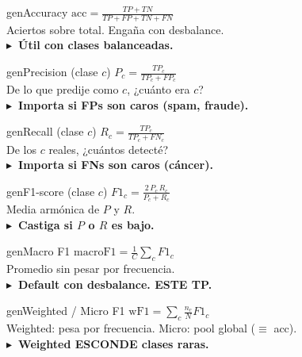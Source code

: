 \documentclass[10pt]{article}
\newcommand{\fb}[1]{{\color{label}\small #1}}
\newcommand{\tip}[2]{{\color{#1}\textbf{$\blacktriangleright$\ #2}}}
\newcommand{\formulabox}[1]{{\color{formula}\large $\displaystyle #1$}}
\begin{document}
\noindent
\begin{minipage}[t]{0.325\textwidth}
\begin{card}{gen}{Accuracy}
\formulabox{\mathrm{acc} = \frac{TP + TN}{TP + FP + TN + FN}}\\[6pt]
\fb{Aciertos sobre total. Engaña con desbalance.}\\[3pt]
\tip{gen}{Útil con clases balanceadas.}
\end{card}
\end{minipage}\hfill
\begin{minipage}[t]{0.325\textwidth}
\begin{card}{gen}{Precision (clase $c$)}
\formulabox{P_c = \frac{TP_c}{TP_c + FP_c}}\\[6pt]
\fb{De lo que predije como $c$, ¿cuánto era $c$?}\\[3pt]
\tip{gen}{Importa si FPs son caros (spam, fraude).}
\end{card}
\end{minipage}\hfill
\begin{minipage}[t]{0.325\textwidth}
\begin{card}{gen}{Recall (clase $c$)}
\formulabox{R_c = \frac{TP_c}{TP_c + FN_c}}\\[6pt]
\fb{De los $c$ reales, ¿cuántos detecté?}\\[3pt]
\tip{gen}{Importa si FNs son caros (cáncer).}
\end{card}
\end{minipage}
\vspace{6pt}

\noindent
\begin{minipage}[t]{0.325\textwidth}
\begin{card}{gen}{F1-score (clase $c$)}
\formulabox{F1_c = \frac{2\,P_c\,R_c}{P_c + R_c}}\\[6pt]
\fb{Media armónica de $P$ y $R$.}\\[3pt]
\tip{gen}{Castiga si $P$ o $R$ es bajo.}
\end{card}
\end{minipage}\hfill
\begin{minipage}[t]{0.325\textwidth}
\begin{card}{gen}{Macro F1}
\formulabox{\mathrm{macroF1} = \frac{1}{C} \sum_c F1_c}\\[6pt]
\fb{Promedio sin pesar por frecuencia.}\\[3pt]
\tip{gen}{Default con desbalance. ESTE TP.}
\end{card}
\end{minipage}\hfill
\begin{minipage}[t]{0.325\textwidth}
\begin{card}{gen}{Weighted / Micro F1}
\formulabox{\mathrm{wF1} = \sum_c \tfrac{n_c}{N} F1_c}\\[6pt]
\fb{Weighted: pesa por frecuencia. Micro: pool global ($\equiv$ acc).}\\[3pt]
\tip{gen}{Weighted ESCONDE clases raras.}
\end{card}
\end{minipage}
\vspace{12pt}
\end{document}
